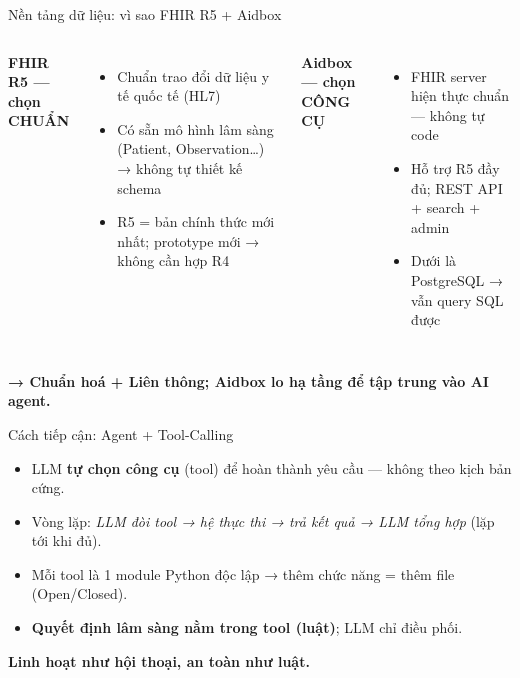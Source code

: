 \documentclass[aspectratio=169,t]{beamer}
\begin{document}
\begin{frame}{Nền tảng dữ liệu: vì sao FHIR R5 + Aidbox}
  \small
  \begin{columns}[t]
      \textbf{\color{hustprimary}FHIR R5 — chọn CHUẨN}
      \begin{itemize}
        \item Chuẩn trao đổi dữ liệu y tế quốc tế (HL7)
        \item Có sẵn mô hình lâm sàng (Patient, Observation…) → không tự thiết kế schema
        \item R5 = bản chính thức mới nhất; prototype mới → không cần hợp R4
      \end{itemize}
      \textbf{\color{hustprimary}Aidbox — chọn CÔNG CỤ}
      \begin{itemize}
        \item FHIR server hiện thực chuẩn — không tự code
        \item Hỗ trợ R5 đầy đủ; REST API + search + admin
        \item Dưới là PostgreSQL → vẫn query SQL được
      \end{itemize}
  \end{columns}
  \vspace{0.25cm}
  \begin{center}\color{hustprimary}\textbf{→ Chuẩn hoá + Liên thông; Aidbox lo hạ tầng để tập trung vào AI agent.}\end{center}
\end{frame}

\begin{frame}{Cách tiếp cận: Agent + Tool-Calling}
  \small
  \begin{itemize}
    \item LLM \textbf{tự chọn công cụ} (tool) để hoàn thành yêu cầu — không theo kịch bản cứng.
    \item Vòng lặp: \emph{LLM đòi tool → hệ thực thi → trả kết quả → LLM tổng hợp} (lặp tới khi đủ).
    \item Mỗi tool là 1 module Python độc lập → thêm chức năng = thêm file (Open/Closed).
    \item \textbf{Quyết định lâm sàng nằm trong tool (luật)}; LLM chỉ điều phối.
  \end{itemize}
  \vspace{0.2cm}
  \begin{center}\color{hustprimary}\textbf{Linh hoạt như hội thoại, an toàn như luật.}\end{center}
\end{frame}
\end{document}
